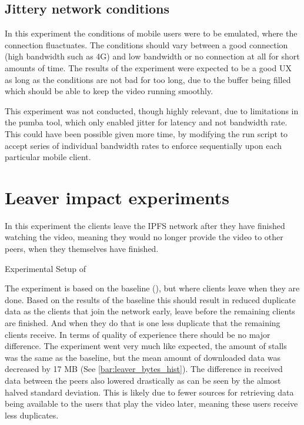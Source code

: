 \if{}

\fi

\subsection{Jittery network conditions}
In this experiment the conditions of mobile users were to be emulated, where the connection fluactuates. The conditions should vary between a good connection (high bandwidth such as 4G) and low bandwidth or no connection at all for short amounts of time.
The results of the experiment were expected to be a good \ac{UX} as long as the conditions are not bad for too long, due to the buffer being filled which should be able to keep the video running smoothly.

This experiment was not conducted, though highly relevant, due to limitations in the pumba tool, which only enabled jitter for latency and not bandwidth rate.
This could have been possible given more time, \eg by modifying the run script to accept series of individual bandwidth rates to enforce sequentially upon each particular mobile client.

\FloatBarrier \section{Leaver impact experiments}
\label{sec:eval_leaver}
In this experiment the clients  leave the \ac{IPFS} network after they have finished watching the video, meaning they would no longer provide the video to other peers, when they themselves have finished.

\begin{table}[!htbp]
    \myfloatalign
    \caption[Experimental Setup of Leaver]{Experimental Setup of }
    \label{tab:exp_overview_leaver}
    
\end{table}

The experiment is based on the baseline (), but where clients leave when they are done. Based on the results of the baseline this should result in reduced duplicate data as the clients that join the network early, leave before the remaining clients are finished. And when they do that is one less duplicate that the remaining clients receive. In terms of quality of experience there should be no major difference.
The experiment went very much like expected, the amount of stalls was the same as the baseline, but the mean amount of downloaded data was decreased by 17 \ac{MB} (See \autoref{bar:leaver_bytes_hist}). The difference in received data between the peers also lowered drastically as can be seen by the almost halved standard deviation. This is likely due to fewer sources for retrieving data being available to the users that play the video later, meaning these users receive less duplicates.

